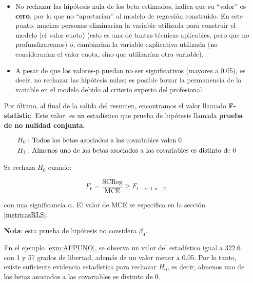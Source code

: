 \documentclass[
  11pt,
]{book}
\theoremstyle{definition}
\theoremstyle{definition}
\theoremstyle{definition}
\theoremstyle{definition}
\theoremstyle{remark}
\begin{document}
\begin{itemize}
\item
  No rechazar las hipótesis nula de los beta estimados, indica que su ``valor'' es \textbf{cero}, por lo que no ``aportarían'' al modelo de regresión construido. En este punto, muchas personas eliminarían la variable utilizada para construir el modelo (el valor cuota) (esto es una de tantas técnicas aplicables, pero que no profundizaremos) o, cambiarían la variable explicativa utilizada (no considerarían el valor cuota, sino que utilizarían otra variable).
\item
  A pesar de que los valores-p puedan no ser significativos (mayores a 0.05), es decir, no rechazar las hipótesis nulas; es posible forzar la permanencia de la variable en el modelo debido al criterio experto del profesional.
\end{itemize}

Por último, al final de la salida del resumen, encontramos el valor llamado \textbf{F-statistic}. Este valor, es un estadístico que prueba de hipótesis llamada \textbf{prueba de no nulidad conjunta},

\begin{equation}
\notag
\begin{split}
H_0:&\text{ Todos los betas asociados a las covariables valen 0}\\
H_1:&\text{ Almenos uno de los betas asociados a las covariables es distinto de 0}\\
\end{split}
\end{equation}

Se rechaza \(H_0\) cuando:

\begin{equation}
F_0 = \frac{\text{SCReg}}{\text{MCE}} \geq F_{1-\alpha, 1, n-2}.
\label{eq:estadistico-F-RLS}
\end{equation}

con una significancia \(\alpha\). El valor de MCE se especifica en la sección \ref{metricasRLS}.

\textbf{Nota}: esta prueba de hipótesis no considera \(\beta_0\).

En el ejemplo \ref{exm:AFPUNO}, se observa un valor del estadístico igual a 322.6 con 1 y 57 grados de libertad, además de un valor menor a 0.05. Por lo tanto, existe suficiente evidencia estadística para rechazar \(H_0\), es decir, almenos uno de los betas asociados a las covariables es distinto de 0.
\end{document}
